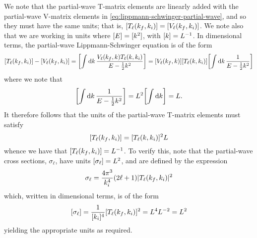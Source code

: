 \documentclass{article}
\begin{document}
We note that the partial-wave T-matrix elements are linearly added with the
partial-wave V-matrix elements in \autoref{eq:lippmann-schwinger-partial-wave},
and so they must have the same units; that is,
$\lrsq{T_{\ell}\lr{k_{f}, k_{i}}} = \lrsq{V_{\ell}\lr{k_{f}, k_{i}}}$.
We note also that we are working in units where $\lrsq{E} = \lrsq{k^{2}}$, with
$\lrsq{k} = L^{-1}$.
In dimensional terms, the partial-wave Lippmann-Schwinger equation is of the
form
\begin{equation*}
  \lrsq{T_{\ell}\lr{k_{f}, k_{i}}}
  -
  \lrsq{V_{\ell}\lr{k_{f}, k_{i}}}
  =
  \lrsq[\bigg]
  {
    \int
    \dd{k}
    \dfrac
    {
      V_{\ell}\lr{k_{f}, k}
      T_{\ell}\lr{k, k_{i}}
    }
    {
      E
      -
      \tfrac{1}{2}
      k^{2}
    }
  }
  =
  \lrsq{V_{\ell}\lr{k_{f}, k}}
  \lrsq{T_{\ell}\lr{k, k_{i}}}
  \lrsq[\bigg]
  {
    \int
    \dd{k}
    \dfrac
    {
      1
    }
    {
      E
      -
      \tfrac{1}{2}
      k^{2}
    }
  }
\end{equation*}
where we note that
\begin{equation*}
  \lrsq[\bigg]
  {
    \int
    \dd{k}
    \dfrac
    {
      1
    }
    {
      E
      -
      \tfrac{1}{2}
      k^{2}
    }
  }
  =
  L^{2}
  \lrsq[\bigg]
  {
    \int
    \dd{k}
  }
  =
  L
  .
\end{equation*}
It therefore follows that the units of the partial-wave T-matrix elements must
satisfy
\begin{equation*}
  \lrsq{T_{\ell}\lr{k_{f}, k_{i}}}
  =
  \lrsq{T_{\ell}\lr{k, k_{i}}}^{2}
  L
\end{equation*}
whence we have that $\lrsq{T_{\ell}\lr{k_{f}, k_{i}}} = L^{-1}$.
To verify this, note that the partial-wave cross sections, $\sigma_{\ell}$, have
units $\lrsq{\sigma_{\ell}} = L^{2}$, and are defined by the expression
\begin{equation*}
  \sigma_{\ell}
  =
  \dfrac{4 \pi^{3}}{k_{i}^{4}}
  \lr{2 \ell + 1}
  \lrabs{T_{\ell}\lr{k_{f}, k_{i}}}^{2}
\end{equation*}
which, written in dimensional terms, is of the form
\begin{equation*}
  \lrsq{\sigma_{\ell}}
  =
  \dfrac{1}{\lrsq{k_{i}}^{4}}
  \lrsq{T_{\ell}\lr{k_{f}, k_{i}}}^{2}
  =
  L^{4}
  L^{-2}
  =
  L^{2}
\end{equation*}
yielding the appropriate units as required.
\end{document}
